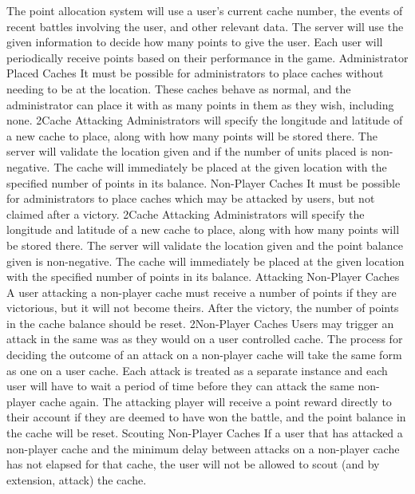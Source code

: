			{The point allocation system will use a user's current cache 
			number, the events of recent battles involving the user, and other 
			relevant data.}
			{The server will use the given information to decide how many
			points to give the user.}
			{Each user will periodically receive points based on their 
			performance in the game.}
		\funcreq
			{Administrator Placed Caches}
			{It must be possible for administrators to place caches without 
			needing to be at the location. These caches behave as normal, and
			the administrator can place it with as many points in them as they
			wish, including none.}
			{2}{Cache Attacking}
			{Administrators will specify the longitude and latitude of a new 
			cache to place, along with how many points will be stored there.}
			{The server will validate the location given and if the number of 
			units placed is non-negative.}
			{The cache will immediately be placed at the given location with 
			the specified number of points in its balance.}
		\funcreq
			{Non-Player Caches}
			{It must be possible for administrators to place caches which may 
			be attacked by users, but not claimed after a victory.}
			{2}{Cache Attacking}
			{Administrators will specify the longitude and latitude of a new 
			cache to place, along with how many points will be stored there.}
			{The server will validate the location given and the point balance 
			given is non-negative.}
			{The cache will immediately be placed at the given location with 
			the specified number of points in its balance.}
		\funcreq
			{Attacking Non-Player Caches}
			{A user attacking a non-player cache must receive a number of 
			points if they are victorious, but it will not become theirs. 
			After the victory, the number of points in the cache balance should 
			be reset.}
			{2}{Non-Player Caches}
			{Users may trigger an attack in the same was as they would on a 
			user controlled cache.}
			{The process for deciding the outcome of an attack on a non-player 
			cache will take the same form as one on a user cache. Each attack 
			is treated as a separate instance and each user will have to wait a
			period of time before they can attack the same non-player cache 
			again.}
			{The attacking player will receive a point reward directly to 
			their account if they are deemed to have won the battle, and the 
			point balance in the cache will be reset.}
		\funcreq
			{Scouting Non-Player Caches}
			{If a user that has attacked a non-player cache and the minimum
			delay between attacks on a non-player cache has not elapsed for
			that cache, the	user will not be allowed to scout (and by
			extension, attack) the cache.}

